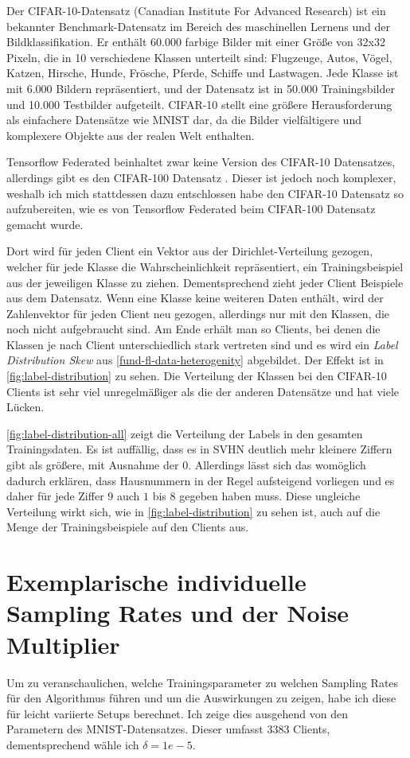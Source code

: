 Der CIFAR-10-Datensatz (Canadian Institute For Advanced Research) ist ein bekannter Benchmark-Datensatz im Bereich des maschinellen Lernens und der Bildklassifikation. Er enthält 60.000 farbige Bilder mit einer Größe von 32x32 Pixeln, die in 10 verschiedene Klassen unterteilt sind: Flugzeuge, Autos, Vögel, Katzen, Hirsche, Hunde, Frösche, Pferde, Schiffe und Lastwagen. Jede Klasse ist mit 6.000 Bildern repräsentiert, und der Datensatz ist in 50.000 Trainingsbilder und 10.000 Testbilder aufgeteilt. CIFAR-10 stellt eine größere Herausforderung als einfachere Datensätze wie MNIST dar, da die Bilder vielfältigere und komplexere Objekte aus der realen Welt enthalten. 

Tensorflow Federated beinhaltet zwar keine Version des CIFAR-10 Datensatzes, allerdings gibt es den CIFAR-100 Datensatz \cite{krizhevsky:2009}. Dieser ist jedoch noch komplexer, weshalb ich mich stattdessen dazu entschlossen habe den CIFAR-10 Datensatz so aufzubereiten, wie es von Tensorflow Federated beim CIFAR-100 Datensatz gemacht wurde. 

Dort wird für jeden Client ein Vektor aus der Dirichlet-Verteilung gezogen, welcher für jede Klasse die Wahrscheinlichkeit repräsentiert, ein Trainingsbeispiel aus der jeweiligen Klasse zu ziehen. Dementsprechend zieht jeder Client Beispiele aus dem Datensatz. Wenn eine Klasse keine weiteren Daten enthält, wird der Zahlenvektor für jeden Client neu gezogen, allerdings nur mit den Klassen, die noch nicht aufgebraucht sind. Am Ende erhält man so Clients, bei denen die Klassen je nach Client unterschiedlich stark vertreten sind und es wird ein \textit{Label Distribution Skew} aus \autoref{fund-fl-data-heterogenity} abgebildet. Der Effekt ist in \autoref{fig:label-distribution} zu sehen. Die Verteilung der Klassen bei den CIFAR-10 Clients ist sehr viel unregelmäßiger als die der anderen Datensätze und hat viele Lücken.

\autoref{fig:label-distribution-all} zeigt die Verteilung der Labels in den gesamten Trainingsdaten. Es ist auffällig, dass es in SVHN deutlich mehr kleinere Ziffern gibt als größere, mit Ausnahme der $0$. Allerdings lässt sich das womöglich dadurch erklären, dass Hausnummern in der Regel aufsteigend vorliegen und es daher für jede Ziffer $9$ auch $1$ bis $8$ gegeben haben muss. Diese ungleiche Verteilung wirkt sich, wie in \autoref{fig:label-distribution} zu sehen ist, auch auf die Menge der Trainingsbeispiele auf den Clients aus.

\section{Exemplarische individuelle Sampling Rates und der Noise Multiplier}
Um zu veranschaulichen, welche Trainingsparameter zu welchen Sampling Rates für den Algorithmus führen und um die Auswirkungen zu zeigen, habe ich diese für leicht variierte Setups berechnet. Ich zeige dies ausgehend von den Parametern des MNIST-Datensatzes. Dieser umfasst $3383$ Clients, dementsprechend wähle ich $\delta= 1e-5$. 

